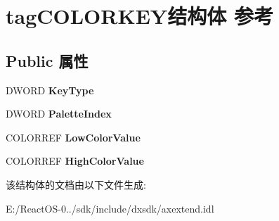 \hypertarget{structtag_c_o_l_o_r_k_e_y}{}\section{tag\+C\+O\+L\+O\+R\+K\+E\+Y结构体 参考}
\label{structtag_c_o_l_o_r_k_e_y}
\subsection*{Public 属性}
\begin{DoxyCompactItemize}
\item 
\mbox{\label{structtag_c_o_l_o_r_k_e_y_a0c4f8e4b72c8db01fee2082f342f10a2}} 
D\+W\+O\+RD {\bfseries Key\+Type}
\item 
\mbox{\label{structtag_c_o_l_o_r_k_e_y_aa96d104e8fca8d4277f0deadcd5969c8}} 
D\+W\+O\+RD {\bfseries Palette\+Index}
\item 
\mbox{\label{structtag_c_o_l_o_r_k_e_y_a9b8806b0176608e14098c2d42be6e781}} 
C\+O\+L\+O\+R\+R\+EF {\bfseries Low\+Color\+Value}
\item 
\mbox{\label{structtag_c_o_l_o_r_k_e_y_a9272583c51e6d548ea79432e012af775}} 
C\+O\+L\+O\+R\+R\+EF {\bfseries High\+Color\+Value}
\end{DoxyCompactItemize}


该结构体的文档由以下文件生成\+:\begin{DoxyCompactItemize}
\item 
E\+:/\+React\+O\+S-\/0../sdk/include/dxsdk/axextend.\+idl\end{DoxyCompactItemize}
